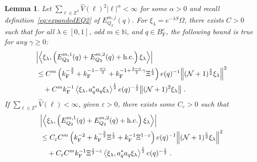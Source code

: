 \documentclass[12pt,a4paper]{article}
\numberwithin{equation}{section}
\newcommand{\NNN}{\mathbb{N}}
\newcommand{\1}{\mathbb{I}}
\newcommand{\F}{\mathrm{F}}
\newcommand{\kF}{k_\F}
\newcommand{\Zstar}{\mathbb{Z}^3} %
\newcommand{\Z}{\mathbb{Z}}
\newcommand{\NN}{\mathcal{N}}
\newcommand{\half}{\frac{1}{2}}
\newcommand{\eva}[1]{\left\langle #1 \right\rangle}
\theoremstyle{plain}
\newtheorem{lemma}[theorem]{Lemma}
\theoremstyle{definition}
\theoremstyle{remark}
\theoremstyle{plain}
\theoremstyle{definition}
\theoremstyle{remark}
\begin{document}
\begin{lemma} \label{lem:EQ211}
Let $ \sum_{\ell \in \Zstar} \hat{V}(\ell)^2 |\ell|^\alpha < \infty $ for some $ \alpha > 0 $ and recall definition~\eqref{eq:expandedEQ2} of $ E_{Q_2}^{m,j}(q) $. For $\xi_\lambda = e^{-\lambda S} \Omega$, there exists $ C > 0 $ such that for all $ \lambda \in [0,1] $, odd $ m \in \NNN $, and $ q \in B_{\F}^c $, the following bound is true for any $ \gamma \ge 0 $:
\begin{align}
	& \abs{\eva{\xi_\lambda,\left(E^{m,1}_{Q_2}(q) + E^{m,2}_{Q_2}(q) + \mathrm{h.c.}\right) \xi_\lambda }} \label{eq:estEQ211_Coulomb}\\
	&\leq C^m \left( \kF^{-\frac 32}
		+ \kF^{-1-\frac{\alpha \gamma}{2}}
		+ \kF^{-1+ \frac{3-\alpha}{2} \gamma} \Xi^{\half} \right) e(q)^{-1}
		\norm{ (\NN+1)^{\frac 52} \xi_\lambda }^2 \nonumber\\
	&\quad + C^m \kF^{-1} \eva{\xi_\lambda, a_q^* a_q \xi_\lambda}^{\half} e(q)^{-\half} \norm{ (\NN+1)^2 \xi_\lambda } \;. \nonumber
\end{align}
If $ \sum_{\ell \in \Zstar} \hat{V}(\ell) < \infty $, given $ \varepsilon > 0 $, there exists some $ C_\varepsilon > 0 $ such that
\begin{align}
	& \abs{\eva{\xi_\lambda,\left(E^{m,1}_{Q_2}(q) + E^{m,2}_{Q_2}(q) + \mathrm{h.c.}\right) \xi_\lambda }} \label{eq:estEQ211} \\
	&\leq C_\varepsilon C^m \left( \kF^{-2}
		+ \kF^{-\frac{3}{2}} \Xi^\half
		+ \kF^{-1}\Xi^{1-\varepsilon} \right) e(q)^{-1}
		\norm { (\NN+1)^{\frac 52} \xi_\lambda }^2 \nonumber\\
	&\quad + C_\varepsilon C^m \kF^{-1} \Xi^{\half - \varepsilon} \eva{\xi_\lambda, a_q^* a_q \xi_\lambda}^{\half} e(q)^{-\half} \;. \nonumber
\end{align}
\end{lemma}
\end{document}
